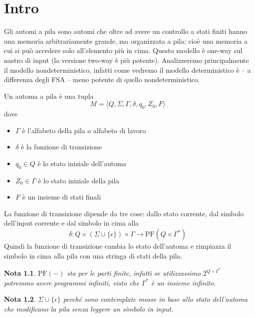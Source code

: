 \documentclass[12pt]{report}
\newtheorem{nota}{Nota}
\begin{document}
\tableofcontents
\newpage

\chapter{Intro}
Gli automi a pila sono automi che oltre ad avere un controllo a stati finiti hanno una memoria arbitrariamente grande, ma organizzata a pila; cioè una memoria a cui si può accedere solo all'elemento più in cima.
Questo modello è one-way sul nastro di input (la versione two-way è più potente).
Analizzeremo principalmente il modello nondeterministico, infatti come vedremo il modello deterministico è -- a differenza degli FSA -- meno potente di quello nondeterministico.

Un automa a pila è una tupla
$$ M = \langle Q, \Sigma, \Gamma, \delta, q_0, Z_0, F \rangle $$
\noindent dove
\begin{itemize}
	\item $\Gamma$ è l'alfabeto della pila o alfabeto di lavoro
	\item $\delta$ è la funzione di transizione
	\item $q_0 \in Q$ è lo stato iniziale dell'automa
	\item $Z_0 \in \Gamma$ è lo stato iniziale della pila
	\item $F$ è un insieme di stati finali
\end{itemize}
La funzione di transizione dipende da tre cose: dallo stato corrente, dal simbolo dell'input corrente e dal simbolo in cima alla 
$$ \delta : Q \times (\Sigma \cup \{\epsilon\}) \times \Gamma \rightarrow \text{PF}(Q \times \Gamma^*) $$
Quindi la funzione di transizione cambia lo stato dell'automa e rimpiazza il simbolo in cima alla pila con una stringa di stati della pila.
\begin{nota}
	$\text{PF}(-)$ sta per le parti finite, infatti se utilizzassimo $2^{Q \times \Gamma^*}$ potremmo avere programmi infiniti, visto che $\Gamma^*$ è un insieme infinito.
\end{nota}
\begin{nota}
	$\Sigma \cup \{ \epsilon \}$ perché sono contemplate mosse in base allo stato dell'automa che modificano la pila senza leggere un simbolo in input.
\end{nota}
\end{document}
